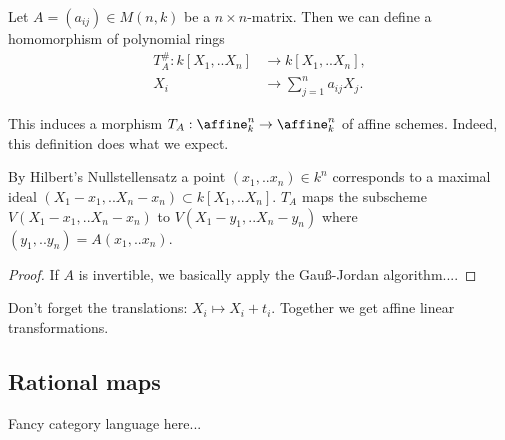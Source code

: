 \begin{definition} Let $A = (a_{ij}) \in M(n,k)$ be a $n\times n$-matrix. Then we can define a homomorphism of polynomial rings
\begin{align}
T^\#_A : k[X_1,.. X_n] &\to k[X_1,.. X_n], \\
X_i &\to \sum_{j=1}^n a_{ij}X_j.
\end{align}
\end{definition}

This induces a morphism $T_A : \affine^n_k \to \affine^n_k$ of affine schemes. Indeed, this definition does what we expect.

\begin{proposition} By Hilbert's Nullstellensatz a point $(x_1,..x_n) \in k^n$ corresponds to a maximal ideal $(X_1-x_1,.. X_n-x_n) \subset k[X_1,..X_n]$.
$T_A$ maps the subscheme $V(X_1-x_1,..X_n-x_n)$ to $V(X_1-y_1,..X_n-y_n)$ where $(y_1,..y_n) = A(x_1,..x_n)$.
\end{proposition}

\begin{proof} If $A$ is invertible, we basically apply the Gauß-Jordan algorithm....
\end{proof}

Don't forget the translations: $X_i \mapsto X_i + t_i$.
Together we get affine linear transformations.


\subsection{Rational maps}

Fancy category language here...
